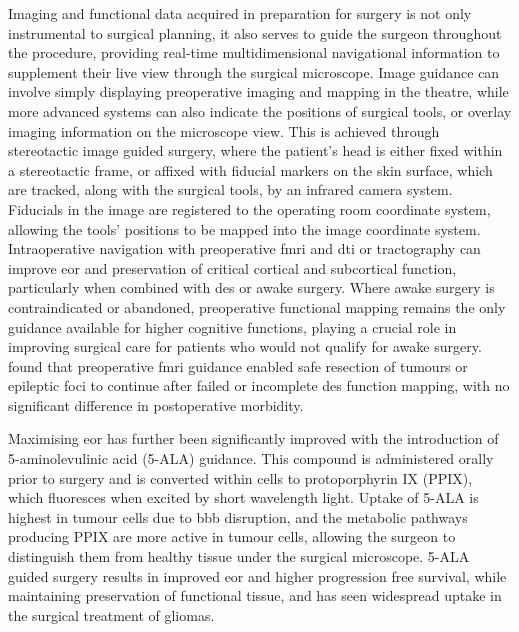 Imaging and functional data acquired in preparation for surgery is not only instrumental to surgical planning, it also serves to guide the surgeon throughout the procedure, providing real-time multidimensional navigational information to supplement their live view through the surgical microscope.
Image guidance can involve simply displaying preoperative imaging and mapping in the theatre, while more advanced systems can also indicate the positions of surgical tools, or overlay imaging information on the microscope view.
This is achieved through stereotactic image guided surgery, where the patient's head is either fixed within a stereotactic frame, or affixed with fiducial markers on the skin surface, which are tracked, along with the surgical tools, by an infrared camera system\autocite{Sattur2019}.
Fiducials in the image are registered to the operating room coordinate system, allowing the tools' positions to be mapped into the image coordinate system.
Intraoperative navigation with preoperative \gls{fmri} and \gls{dti} or tractography can improve \gls{eor} and preservation of critical cortical and subcortical function\autocite{Wu2007,Bello2008,Bello2010d}, particularly when combined with \gls{des} or awake surgery\autocite{Aibar-Duran2020}.
Where awake surgery is contraindicated or abandoned, preoperative functional mapping remains the only guidance available for higher cognitive functions, playing a crucial role in improving surgical care for patients who would not qualify for awake surgery.
\textcite{Rigolo2020a} found that preoperative \gls{fmri} guidance enabled safe resection of tumours or epileptic foci to continue after failed or incomplete \gls{des} function mapping, with no significant difference in postoperative morbidity.

Maximising \gls{eor} has further been significantly improved with the introduction of 5-aminolevulinic acid (5-ALA) guidance.
This compound is administered orally prior to surgery and is converted within cells to protoporphyrin IX (PPIX), which fluoresces when excited by short wavelength light.
Uptake of 5-ALA is highest in tumour cells due to \gls{bbb} disruption, and the metabolic pathways producing PPIX are more active in tumour cells, allowing the surgeon to distinguish them from healthy tissue under the surgical microscope.
5-ALA guided surgery results in improved \gls{eor} and higher progression free survival, while maintaining preservation of functional tissue\autocite{Coburger2019,Golub2020}, and has seen widespread uptake in the surgical treatment of gliomas\autocite{Stummer2006}.

